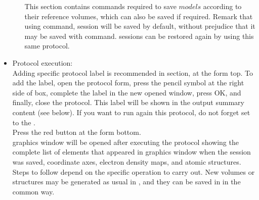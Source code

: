 \begin{itemize}
\begin{itemize}
    This section contains \chimera commands required to save $models$ according to their reference volumes, which can also be saved if required. Remark that using  command, \chimera session will be saved by default, without prejudice that it may be saved with  command. \chimera sessions can be restored again by using this same  protocol.\\
    
    \end{itemize}

  \item Protocol execution:\\
  
  Adding specific protocol label is recommended in  section, at the form top. To add the label, open the protocol form, press the pencil symbol at the right side of  box, complete the label in the new opened window, press OK, and finally, close the protocol. This label will be shown in the output summary content (see below). If you want to run again this protocol, do not forget set to  the .\\
  Press the  red button at the form bottom.\\
  
  \chimera graphics window will be opened after executing the protocol showing the complete list of elements that appeared in \chimera graphics window when the session was saved, coordinate axes, electron density maps, and atomic structures. Steps to follow depend on the specific operation to carry out. New volumes or structures may be generated as usual in \chimera, and they can be saved in \scipion in the common way.\\
  \begin{itemize}
   

\end{itemize}
\end{itemize}
